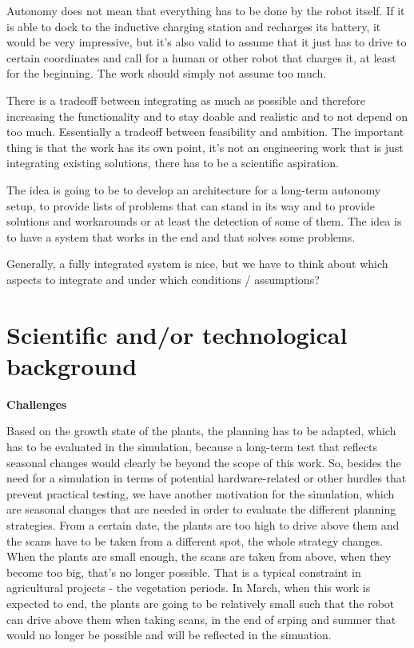 \documentclass[german, master, expose, latin1]{base/thesis_KBS}
\begin{document}
Autonomy does not mean that everything has to be done by the robot itself. If it is able to dock to the inductive charging station and recharges its battery,
it would be very impressive, but it's also valid to assume that it just has to drive to certain coordinates and call for a human or other robot that charges it,
at least for the beginning. The work should simply not assume too much.\newline

There is a tradeoff between integrating as much as possible and therefore increasing the functionality and to stay doable and realistic and to not depend on too much.\newline
Essentially a tradeoff between feasibility and ambition. The important thing is that the work has its own point, it's not an engineering work that is just 
integrating existing solutions, there has to be a scientific aspiration.\newline

The idea is going to be to develop an architecture for a long-term autonomy setup, to provide lists of problems that can stand in its way and to provide solutions
and workarounds or at least the detection of some of them. The idea is to have a system that works in the end and that solves some problems.\newline

Generally, a fully integrated system is nice, but we have to think about which aspects to integrate and under which conditions / assumptions?

\section{Scientific and/or technological background}

\textbf{Challenges}\newline

Based on the growth state of the plants, the planning has to be adapted, which has to be evaluated in the simulation, because a long-term test that reflects
seasonal changes would clearly be beyond the scope of this work. So, besides the need for a simulation in terms of potential hardware-related or other hurdles
that prevent practical testing, we have another motivation for the simulation, which are seasonal changes that are needed in order to evaluate the different
planning strategies. From a certain date, the plants are too high to drive above them and the scans have to be taken from a different spot, the whole strategy changes.
When the plants are small enough, the scans are taken from above, when they become too big, that's no longer possible.
That is a typical constraint in agricultural projects - the vegetation periods.
In March, when this work is expected to end, the plants are going to be relatively small such that the robot can drive above them when taking
scans, in the end of srping and summer that would no longer be possible and will be reflected in the simuation.
\end{document}
